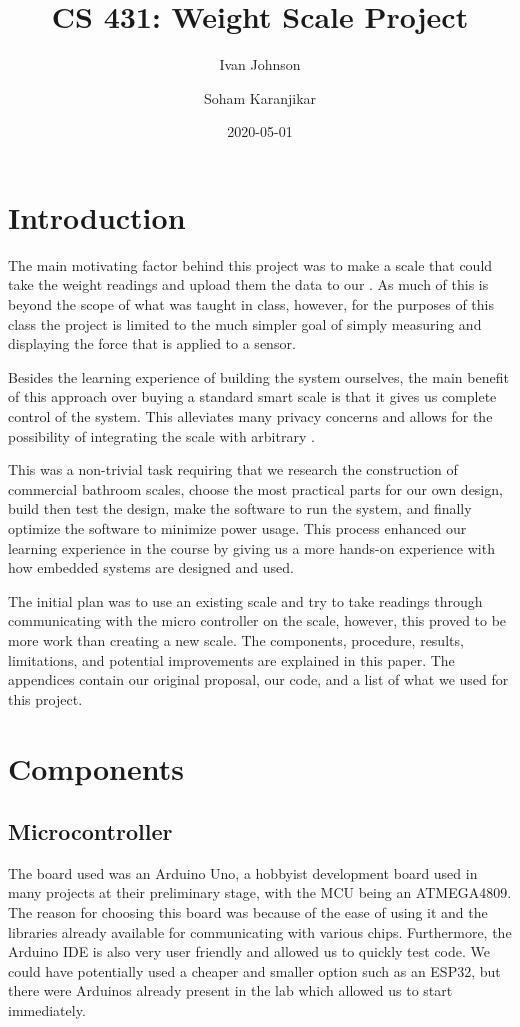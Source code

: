 \documentclass[letterpaper,11pt]{article}
\title{CS 431: Weight Scale Project}
\author{Ivan Johnson \and Soham Karanjikar}
\date{2020-05-01}
\newcommand{\myLink}[2]{\href{#1}{\color{blue}\underline{\smash{\texttt{#2}}}}}
\begin{document}
\maketitle

\newpage
\section{Introduction}
The main motivating factor behind this project was to make a scale that could
take the weight readings and upload them the data to our
\myLink{https://github.com/Ivan-Johnson/LifeLogServer}{private servers}. As much
of this is beyond the scope of what was taught in class, however, for the
purposes of this class the project is limited to the much simpler goal of simply
measuring and displaying the force that is applied to a sensor.

Besides the learning experience of building the system ourselves, the main
benefit of this approach over buying a standard smart scale is that it gives us
complete control of the system. This alleviates many privacy concerns and allows
for the possibility of integrating the scale with arbitrary
\myLink{https://github.com/Ivan-Johnson/LifeLogServer}{health tracking systems}.

This was a non-trivial task requiring that we research the construction of
commercial bathroom scales, choose the most practical parts for our own design,
build then test the design, make the software to run the system, and finally
optimize the software to minimize power usage. This process enhanced our
learning experience in the course by giving us a more hands-on experience with
how embedded systems are designed and used.

The initial plan was to use an existing scale and try to take readings through
communicating with the micro controller on the scale, however, this proved to be
more work than creating a new scale. The components, procedure, results,
limitations, and potential improvements are explained in this paper. The
appendices contain our original proposal, our code, and a list of what we used
for this project.

\section{Components}
\subsection{Microcontroller}
The board used was an Arduino Uno, a hobbyist development board used in many
projects at their preliminary stage, with the MCU being an ATMEGA4809. The
reason for choosing this board was because of the ease of using it and the
libraries already available for communicating with various chips. Furthermore,
the Arduino IDE is also very user friendly and allowed us to quickly test
code. We could have potentially used a cheaper and smaller option such as an
ESP32, but there were Arduinos already present in the lab which allowed us to
start immediately.
\end{document}
